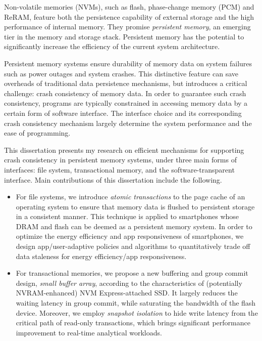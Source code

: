 \begin{eabstract}

Non-volatile memories (NVMs), such as flash, phase-change memory (PCM) and
ReRAM, feature both the persistence capability of external storage and the high
performance of internal memory. They promise \emph{persistent memory}, an
emerging tier in the memory and storage stack. Persistent memory has the
potential to significantly increase the efficiency of the current system
architecture.

Persistent memory systems ensure durability of memory data on system failures
such as power outages and system crashes. This distinctive feature can save
overheads of traditional data persistence mechanisms, but introduces a critical
challenge: crash consistency of memory data. In order to guarantee such crash
consistency, programs are typically constrained in accessing memory data by a
certain form of software interface. The interface choice and its corresponding
crash consistency mechanism largely determine the system performance and the
ease of programming.

This dissertation presents my research on efficient mechanisms for supporting
crash consistency in persistent memory systems, under three main forms of
interfaces: file system, transactional memory, and the software-transparent
interface.  Main contributions of this dissertation include the following.

\begin{itemize}
\item For file systems, we introduce \emph{atomic transactions} to the page
cache of an operating system to ensure that memory data is flushed to
persistent storage in a consistent manner. This technique is applied to
smartphones whose DRAM and flash can be deemed as a persistent memory system.
In order to optimize the energy efficiency and app responsiveness of
smartphones, we design app/user-adaptive policies and algorithms to
quantitatively trade off data staleness for energy efficiency/app
responsiveness.

\item For transactional memories, we propose a new buffering and group commit
design, \emph{small buffer array}, according to the characteristics of
(potentially NVRAM-enhanced) NVM Express-attached SSD. It largely reduces the
waiting latency in group commit, while saturating the bandwidth of the flash
device. Moreover, we employ \emph{snapshot isolation} to hide write latency
from the critical path of read-only transactions, which brings significant
performance improvement to real-time analytical workloads.


\end{itemize}
\end{eabstract}
